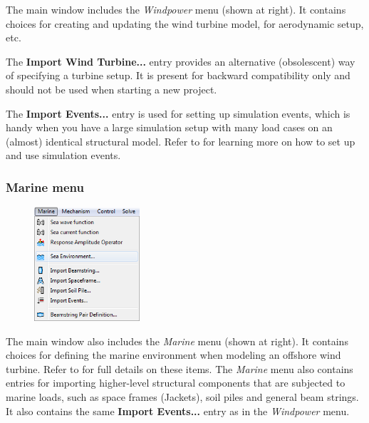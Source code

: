 The main window includes the {\sl Windpower} menu \newline
(shown at right). It contains choices for creating \newline
and updating the wind turbine model, \newline
for aerodynamic setup, etc.

The \textbf{Import Wind Turbine...} entry \newline
provides an alternative (obsolescent) way of \newline
specifying a turbine setup. It is present for \newline
backward compatibility only and should not \newline
be used when starting a new project.

The \textbf{Import Events...} entry is used for setting up simulation events,
which is handy when you have a large simulation setup with many load cases on
an (almost) identical structural model.
Refer to  for
learning more on how to set up and use simulation events.

\subsubsection{Marine menu}

\begin{figure}
  \baselineskip
  \includegraphics[width=0.35\textwidth]{Figures/3b-MarineMenu}
\end{figure}

The main window also includes the {\sl Marine} menu (shown at right).
It contains choices for defining the marine environment when modeling an
offshore wind turbine.
Refer to 
for full details on these items.
The {\sl Marine} menu also contains entries for importing higher-level
structural components that are subjected to marine loads, such as space frames
(Jackets), soil piles and general beam strings.
It also contains the same \textbf{Import Events...} entry
as in the {\sl Windpower} menu.

